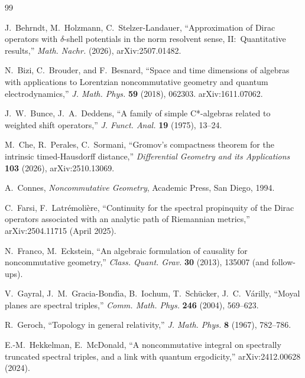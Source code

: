 \documentclass[11pt,a4paper]{article}
\theoremstyle{plain}
\theoremstyle{definition}
\begin{document}
\begin{thebibliography}{99}

J.~Behrndt, M.~Holzmann, C.~Stelzer-Landauer,
``Approximation of Dirac operators with $\delta$-shell potentials in the
norm resolvent sense, II:\ Quantitative results,''
\emph{Math. Nachr.} (2026), arXiv:2507.01482.

N.~Bizi, C.~Brouder, and F.~Besnard, ``Space and time dimensions of
algebras with applications to Lorentzian noncommutative geometry and
quantum electrodynamics,'' \emph{J. Math. Phys.} \textbf{59} (2018),
062303. arXiv:1611.07062.

J.~W.~Bunce, J.~A.~Deddens, ``A family of simple C*-algebras related
to weighted shift operators,'' \emph{J. Funct. Anal.} \textbf{19}
(1975), 13--24.

M.~Che, R.~Perales, C.~Sormani,
``Gromov's compactness theorem for the intrinsic timed-Hausdorff distance,''
\emph{Differential Geometry and its Applications} \textbf{103} (2026), arXiv:2510.13069.

A.~Connes, \emph{Noncommutative Geometry}, Academic Press, San Diego,
1994.


C.~Farsi, F.~Latr\'emoli\`ere, ``Continuity for the spectral
propinquity of the Dirac operators associated with an analytic path
of Riemannian metrics,'' arXiv:2504.11715 (April 2025).

N.~Franco, M.~Eckstein, ``An algebraic formulation of causality for
noncommutative geometry,''
\emph{Class. Quant. Grav.} \textbf{30} (2013), 135007 (and follow-ups).

V.~Gayral, J.~M.~Gracia-Bond\'\i{}a, B.~Iochum, T.~Sch\"ucker,
J.~C.~V\'arilly, ``Moyal planes are spectral triples,''
\emph{Comm. Math. Phys.} \textbf{246} (2004), 569--623.

R.~Geroch, ``Topology in general relativity,'' \emph{J. Math. Phys.}
\textbf{8} (1967), 782--786.

E.-M.~Hekkelman, E.~McDonald, ``A noncommutative integral on
spectrally truncated spectral triples, and a link with quantum
ergodicity,'' arXiv:2412.00628 (2024).


\end{thebibliography}
\end{document}
